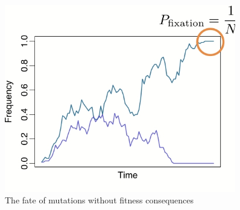 \documentclass[]{article}
\begin{document}
\begin{figure}[H]
	\caption{The fate of mutations without fitness
		consequences}\label{fig:Neutral}
	\includegraphics[width=0.9\textwidth]{Neutral}
\end{figure}
\end{document}
